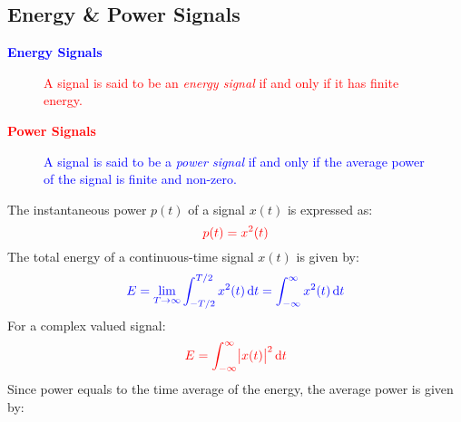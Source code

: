 \documentclass[../notes-main.tex]{subfiles}
\begin{document}
\subsection{Energy \& Power Signals}
\textcolor{blue}{\textbf{Energy Signals}}
\vspace{-1em}
\begin{figure}[H]
    \centering
    \begin{mdframed}
        \begin{center}
            \textcolor{red}{%
                A signal is said to be an \emph{energy signal} if and only if it has finite energy.}
        \end{center}
    \end{mdframed}\label{fig:energy-signal-def-1}
    \vspace{-1em}
\end{figure}
\vspace{-1em}
\noindent \textcolor{red}{\textbf{Power Signals}}
\vspace{-1em}
\begin{figure}[H]
    \centering
    \begin{mdframed}
        \begin{center}
            \textcolor{blue}{%
                A signal is said to be a \emph{power signal} if and only if the average power of the signal is finite and non-zero.}
        \end{center}
    \end{mdframed}\label{fig:power-signal-def-1}
    \vspace{-1em}
\end{figure}
\vspace{-1em}
\noindent The instantaneous power \(p(t)\) of a signal \(x(t)\) is expressed as:
\begin{equation}
    \textcolor{red}{p(t) = x^2(t)}
    \label{eq:instantaneous-power-def}
\end{equation}
The total energy of a continuous-time signal \(x(t)\) is given by:
\begin{equation}
    \textcolor{blue}{E = \lim_{T \to \infty} \int_{-T/2}^{T/2} x^2(t) \dif t = \int_{-\infty}^{\infty} x^2(t) \dif t}
    \label{eq:continuous-time-energy-def}
\end{equation}
For a complex valued signal:
\begin{equation}
    \textcolor{red}{E = \int_{-\infty}^{\infty} \abs{x(t)}^2 \dif t}
    \label{eq:complex-signal-energy-def}
\end{equation}
Since power equals to the time average of the energy, the average power is given by:
\end{document}
